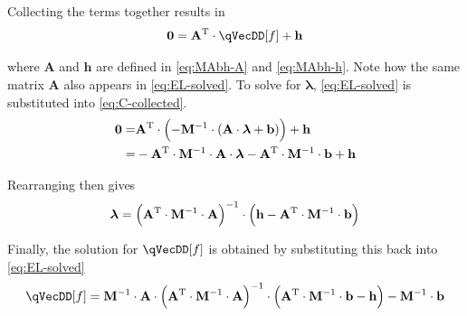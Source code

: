 \documentclass[11pt]{article}
\begin{document}
Collecting the terms together results in
\begin{equation} \label{eq:C-collected}
    \mathbf{0} = \mathbf{A}^{\mathrm{T}} \cdot \qVecDD[f]
    + \mathbf{h}
\end{equation}

where $\mathbf{A}$ and $\mathbf{h}$ are defined in \eqref{eq:MAbh-A} and \eqref{eq:MAbh-h}. Note how the same matrix $\mathbf{A}$ also appears in \eqref{eq:EL-solved}. To solve for $\bm{\lambda}$, \eqref{eq:EL-solved} is substituted into \eqref{eq:C-collected}.
\begin{align}
    \mathbf{0} =& \mathbf{A}^{\mathrm{T}} \cdot \del{- \mathbf{M}^{-1} \cdot \del{\mathbf{A} \cdot \bm{\lambda} + \mathbf{b}}} + \mathbf{h} \nonumber\\
    =& - \mathbf{A}^{\mathrm{T}} \cdot \mathbf{M}^{-1} \cdot \mathbf{A} \cdot \bm{\lambda}
        - \mathbf{A}^{\mathrm{T}} \cdot \mathbf{M}^{-1} \cdot \mathbf{b}
        + \mathbf{h}
\end{align}

Rearranging then gives
\begin{equation} \label{eq:lambda-solved}
    \bm{\lambda} =
        \del{\mathbf{A}^{\mathrm{T}} \cdot \mathbf{M}^{-1} \cdot \mathbf{A}}^{-1} \cdot
        \del{\mathbf{h} - \mathbf{A}^{\mathrm{T}} \cdot \mathbf{M}^{-1} \cdot \mathbf{b}}
\end{equation}

Finally, the solution for $\qVecDD[f]$ is obtained by substituting this back into \eqref{eq:EL-solved}
\begin{equation} \label{eq:qfdd-solved}
    \qVecDD[f] = \mathbf{M}^{-1} \cdot \mathbf{A} \cdot
        \del{\mathbf{A}^{\mathrm{T}} \cdot \mathbf{M}^{-1} \cdot \mathbf{A}}^{-1} \cdot
        \del{\mathbf{A}^{\mathrm{T}} \cdot \mathbf{M}^{-1} \cdot \mathbf{b} - \mathbf{h}}
        - \mathbf{M}^{-1} \cdot \mathbf{b}
\end{equation}
\end{document}
